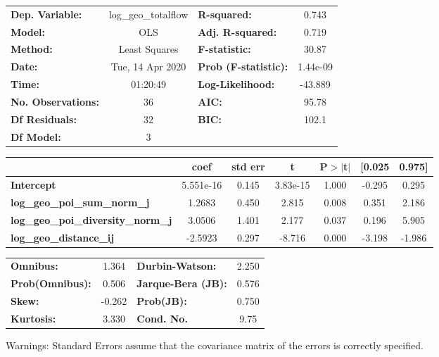 \begin{center}
\begin{tabular}{lclc}
\toprule
\textbf{Dep. Variable:}                    & log\_geo\_totalflow & \textbf{  R-squared:         } &     0.743   \\
\textbf{Model:}                            &         OLS         & \textbf{  Adj. R-squared:    } &     0.719   \\
\textbf{Method:}                           &    Least Squares    & \textbf{  F-statistic:       } &     30.87   \\
\textbf{Date:}                             &   Tue, 14 Apr 2020  & \textbf{  Prob (F-statistic):} &  1.44e-09   \\
\textbf{Time:}                             &       01:20:49      & \textbf{  Log-Likelihood:    } &   -43.889   \\
\textbf{No. Observations:}                 &            36       & \textbf{  AIC:               } &     95.78   \\
\textbf{Df Residuals:}                     &            32       & \textbf{  BIC:               } &     102.1   \\
\textbf{Df Model:}                         &             3       & \textbf{                     } &             \\
\bottomrule
\end{tabular}
\begin{tabular}{lcccccc}
                                           & \textbf{coef} & \textbf{std err} & \textbf{t} & \textbf{P$> |$t$|$} & \textbf{[0.025} & \textbf{0.975]}  \\
\midrule
\textbf{Intercept}                         &    5.551e-16  &        0.145     &  3.83e-15  &         1.000        &       -0.295    &        0.295     \\
\textbf{log\_geo\_poi\_sum\_norm\_j}       &       1.2683  &        0.450     &     2.815  &         0.008        &        0.351    &        2.186     \\
\textbf{log\_geo\_poi\_diversity\_norm\_j} &       3.0506  &        1.401     &     2.177  &         0.037        &        0.196    &        5.905     \\
\textbf{log\_geo\_distance\_ij}            &      -2.5923  &        0.297     &    -8.716  &         0.000        &       -3.198    &       -1.986     \\
\bottomrule
\end{tabular}
\begin{tabular}{lclc}
\textbf{Omnibus:}       &  1.364 & \textbf{  Durbin-Watson:     } &    2.250  \\
\textbf{Prob(Omnibus):} &  0.506 & \textbf{  Jarque-Bera (JB):  } &    0.576  \\
\textbf{Skew:}          & -0.262 & \textbf{  Prob(JB):          } &    0.750  \\
\textbf{Kurtosis:}      &  3.330 & \textbf{  Cond. No.          } &     9.75  \\
\bottomrule
\end{tabular}
\end{center}

Warnings: \newline
 [1] Standard Errors assume that the covariance matrix of the errors is correctly specified.